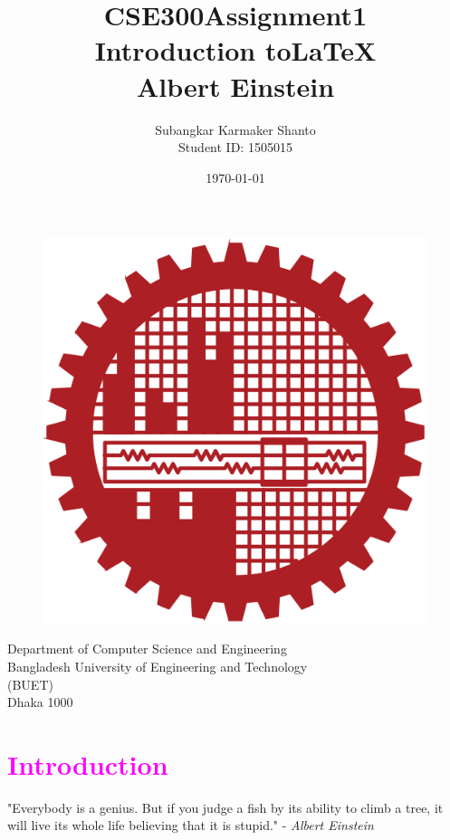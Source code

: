 \documentclass{article}
\title {CSE300\textunderscore Assignment1\\Introduction to\LaTeX\\Albert Einstein}
\author{Subangkar Karmaker Shanto\\Student ID: 1505015}
\date{}
\begin{document}
\begin{titlepage}
\maketitle
\thispagestyle{empty}
\null
\vfill
\begin{figure}[h]
    \centering
    \includegraphics[width=.25\textwidth]{figures/logoBIRN.png}
    \label{fig:logo}
\end{figure}
\begin{center}
Department of Computer Science and Engineering \\Bangladesh University of Engineering and Technology\\(BUET)\\Dhaka 1000 \\
\date{\today}
    
\end{center}
\end{titlepage}

\newpage

\tableofcontents

\newpage


\section{\textcolor{magenta}{Introduction}}

\begin{displayquote}
"Everybody is a genius. But if you judge a fish by its ability to climb a tree, it will live its whole life believing that it is stupid." - {\textit{Albert Einstein}}
\end{displayquote}
\end{document}
